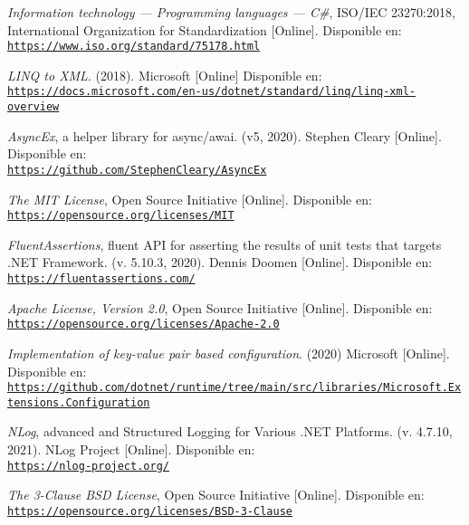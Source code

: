 \begin{thebibliography}{X}
           \textit{Information technology — Programming languages — C\#}, ISO/IEC 23270:2018, International Organization for Standardization [Online]. Disponible en:
            \\ \texttt{\url{https://www.iso.org/standard/75178.html}}
        
            \textit{LINQ to XML}. (2018). Microsoft [Online] Disponible en:
            \\ \texttt{\url{https://docs.microsoft.com/en-us/dotnet/standard/linq/linq-xml-overview}}
        
           \textit{AsyncEx}, a helper library for async/awai. (v5, 2020).  Stephen Cleary [Online]. Disponible en:
            \\ \texttt{\url{https://github.com/StephenCleary/AsyncEx}}
            
              \textit{The MIT License}, Open Source Initiative [Online]. Disponible en:
            \\ \texttt{\url{https://opensource.org/licenses/MIT}}
        
            \textit{FluentAssertions}, fluent API for asserting the results of unit tests that targets .NET Framework. (v. 5.10.3, 2020). Dennis Doomen [Online]. Disponible en:
            \\ \texttt{\url{https://fluentassertions.com/}}
            
             \textit{Apache License, Version 2.0}, Open Source Initiative [Online]. Disponible en:
            \\ \texttt{\url{https://opensource.org/licenses/Apache-2.0}}
        
              \textit{Implementation of key-value pair based configuration}. (2020) Microsoft [Online]. Disponible en:
              \\\texttt{\url{https://github.com/dotnet/runtime/tree/main/src/libraries/Microsoft.Extensions.Configuration}}
            
            \textit{NLog}, advanced and Structured Logging for Various .NET Platforms. (v. 4.7.10, 2021). NLog Project [Online]. Disponible en:
            \\ \texttt{\url{https://nlog-project.org/}}
            
             \textit{The 3-Clause BSD License}, Open Source Initiative [Online]. Disponible en:
            \\ \texttt{\url{https://opensource.org/licenses/BSD-3-Clause}}
        

\end{thebibliography}
